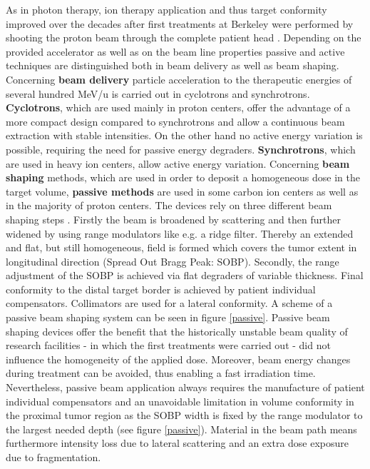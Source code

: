 As in photon therapy, ion therapy application and thus target conformity improved over the decades after first treatments at Berkeley 
were performed by shooting the proton beam through the complete patient head \cite{Tob58}. Depending on the provided accelerator as well 
as on the beam line properties passive and active techniques are distinguished both in beam delivery as well as beam shaping.\newline
\newline
Concerning \textbf{beam delivery} particle acceleration to the therapeutic energies of several hundred MeV/u is carried out in cyclotrons and 
synchrotrons. \textbf{Cyclotrons}, which are used mainly in proton centers, offer the advantage of a more compact design compared to synchrotrons 
and allow a continuous beam extraction with stable intensities. On the other hand no active energy variation is possible, requiring the need 
for passive energy degraders. \textbf{Synchrotrons}, which are used in heavy ion centers, allow active energy variation.\newline
\newline
Concerning \textbf{beam shaping} methods, which are used in order to deposit a homogeneous dose in the target volume, \textbf{passive methods} 
are used in some carbon ion centers as well as in the majority of proton centers. The devices rely on three different beam shaping steps 
\cite{Chu93}. Firstly the beam is broadened by scattering and then further widened by using range modulators like e.g. a 
ridge filter. Thereby an extended and flat, but still homogeneous, field is formed which covers the tumor extent in longitudinal direction 
(Spread Out Bragg Peak: SOBP). Secondly, the range adjustment of the SOBP is achieved via flat degraders of variable thickness. Final 
conformity to the distal target border is achieved by patient individual compensators. Collimators are used for a lateral 
conformity. A scheme of a passive beam shaping system can be seen in figure \ref{passive}. Passive beam shaping devices offer the benefit 
that the historically unstable beam quality of research facilities - in which the first treatments were carried out - did not influence the 
homogeneity of the applied dose. Moreover, beam energy changes during treatment can be avoided, thus enabling a fast irradiation time. 
Nevertheless, passive beam application always requires the manufacture of patient individual compensators and an unavoidable limitation in 
volume conformity in the proximal tumor region as the SOBP width is fixed by the range modulator to the largest needed depth (see 
figure \ref{passive}). Material in the beam path means furthermore intensity loss due to lateral scattering and an extra dose exposure 
due to fragmentation.



